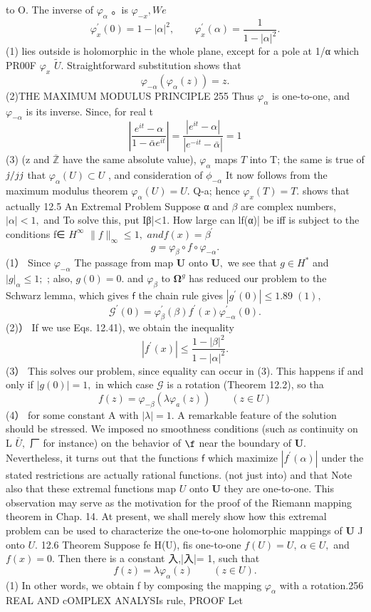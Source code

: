 to O. The inverse of $\varphi_{\alpha}$ 。is $\varphi_{-x},W e$ $$ \varphi_{x}^{\prime}(0)=1-\left|\alpha\right|^{2},\qquad\varphi_{x}^{\prime}(\alpha)=\frac1{1-\left|\alpha\right|^{2}}. $$ (1) lies outside is holomorphic in the whole plane, except for a pole at 1/α which PR00F $\varphi_{x}$ ${\widetilde{U}}.$ Straightforward substitution shows that $$ \varphi_{-\alpha}(\varphi_{\alpha}(z))=z. $$ (2)THE MAXIMUM MODULUS PRINCIPLE 255 Thus $\varphi_{\alpha}$ is one-to-one, and $\varphi_{-\alpha}$ is its inverse. Since, for real t $$ \left|\frac{e^{i t}-\alpha}{1-\bar{\alpha}e^{i t}}\right|=\frac{|e^{i t}-\alpha|}{|e^{-i t}-\bar{\alpha}|}=1 $$ (3) (z and $\overline{{\mathbb{Z}}}$ have the same absolute value), $\varphi_{\alpha}$ maps ${\mathbf{}}T$ into T; the same is true of ${\it j}/j{\it j}$ that $\varphi_{\alpha}(U)\subset U$ , and consideration of $\phi_{-\alpha}$ It now follows from the maximum modulus theorem $\varphi_{\alpha}(U)=U.$ Q-a; hence $\varphi_{x}(T)=T.$ shows that actually 12.5 An Extremal Problem Suppose α and $\beta$ are complex numbers, $|\alpha|<1,$ and To solve this, put Iβ|<1. How large can lf(α)| be iff is subject to the conditions f∈ $H^{\infty}$ $\|f\|_{\infty}\leq1,$ $a n d f(x)=\beta^{\prime}$ $$ g=\varphi_{\beta}\circ f\circ\varphi_{-\alpha}. $$ (1） Since $\varphi_{-\alpha}$ The passage from map ${\boldsymbol{U}}$ onto ${\boldsymbol{U}},$ we see that $g\in H^{*}$ and $|g|_{\alpha}\leq1;$ ; also, $g(0)=0.$ and $\varphi_{\beta}$ to $\mathbf{\Omega}^{g}$ has reduced our problem to the Schwarz lemma, which gives $\boldsymbol{\mathsf{f}}$ the chain rule gives $|g^{\prime}(0)|\leq1.89\;(1),$ $$ {\mathcal{G}}^{\prime}(0)=\varphi_{\beta}^{\prime}(\beta)f^{\prime}(x)\varphi_{-\alpha}^{\prime}(0). $$ (2)） If we use Eqs. 12.41), we obtain the inequality $$ |f^{\prime}(x)|\leq{\frac{1-|\beta|^{2}}{1-|\alpha|^{2}}}. $$ (3） This solves our problem, since equality can occur in (3). This happens if and only if $|g(0)|=1,$ in which case $\scriptstyle{\mathcal{G}}$ is a rotation (Theorem 12.2), so tha $$ f(z)=\varphi_{-\beta}(\lambda\varphi_{a}(z))\qquad(z\in U) $$ (4） for some constant A with $|\lambda|=1.$ A remarkable feature of the solution should be stressed. We imposed no smoothness conditions (such as continuity on L ${\bar{U}},$ 厂 for instance) on the behavior of $\boldsymbol{\f}$ near the boundary of ${\boldsymbol{U}}.$ Nevertheless, it turns out that the functions $\boldsymbol{\mathsf{f}}$ which maximize $|f^{\prime}(\alpha)|$ under the stated restrictions are actually rational functions. (not just into) and that Note also that these extremal functions map $U$ onto ${\boldsymbol{U}}$ they are one-to-one. This observation may serve as the motivation for the proof of the Riemann mapping theorem in Chap. 14. At present, we shall merely show how this extremal problem can be used to characterize the one-to-one holomorphic mappings of ${\boldsymbol{U}}$ J onto $U.$ 12.6 Theorem Suppose fe H(U), fis one-to-one $f(U)=U,\ \alpha\in U,$ and $f(x)=0.$ Then there is a constant 入,|入|= 1, such that $$ f(z)=\lambda\varphi_{\alpha}(z)\qquad(z\in U). $$ (1) In other words, we obtain f by composing the mapping $\varphi_{\alpha}$ with a rotation.256 REAL AND cOMPLEX ANALYSIs rule, PROOF Let 